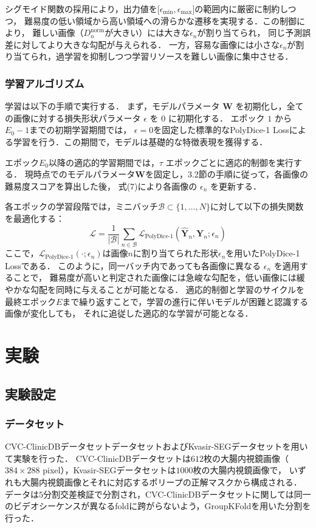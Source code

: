 \documentclass[a4paper,platex,dvipdfmx,twocolumn]{jsarticle}
\begin{document}
シグモイド関数の採用により，出力値を[$\epsilon_{\text{min}}, \epsilon_{\text{max}}]$の範囲内に厳密に制約しつつ，
難易度の低い領域から高い領域への滑らかな遷移を実現する．この制御により，
難しい画像（$D ^ {\text{norm}}_{n}$が大きい）には大きな$\epsilon_n$が割り当てられ，
同じ予測誤差に対してより大きな勾配が与えられる．
一方，容易な画像には小さな$\epsilon_n$が割り当てられ，過学習を抑制しつつ学習リソースを難しい画像に集中させる．

\subsubsection{学習アルゴリズム}
学習は以下の手順で実行する．
まず，モデルパラメータ $\mathbf{W}$ を初期化し，全ての画像に対する損失形状パラメータ $\epsilon$ を $0$ に初期化する．
エポック $1$ から $E_0 - 1$までの初期学習期間では，
$\epsilon=0$を固定した標準的なPolyDice-1 Lossによる学習を行う．この期間で，モデルは基礎的な特徴表現を獲得する．

エポック$E_0$以降の適応的学習期間では，$\tau$ エポックごとに適応的制御を実行する．
現時点でのモデルパラメータ$\mathbf{W}$を固定し，3.2節の手順に従って，各画像の難易度スコアを算出した後，
式(7)により各画像の $\epsilon_n$ を更新する．

各エポックの学習段階では，ミニバッチ$\mathcal{B} \subset \{1, \dots, N\}$に対して以下の損失関数を最適化する：
\begin{equation}
    \mathcal{L} = \frac{1}{|\mathcal{B}|} \sum_{n \in \mathcal{B}} \mathcal{L}_{\text{PolyDice-1}}(\hat{\mathbf{Y}}_n, \mathbf{Y}_n; \epsilon_n)
\end{equation}
ここで，$\mathcal{L}_{\text{PolyDice-1}}(\cdot; \epsilon_n)$は画像$n$に割り当てられた形状$\epsilon_n$を用いたPolyDice-1 Lossである．
このように，同一バッチ内であっても各画像に異なる $\epsilon_n$ を適用することで，
難易度が高いと判定された画像には急峻な勾配を，低い画像には緩やかな勾配を同時に与えることが可能となる．
適応的制御と学習のサイクルを最終エポック$E$まで繰り返すことで，学習の進行に伴いモデルが困難と認識する画像が変化しても，
それに追従した適応的な学習が可能となる．
\section{実験}
\subsection{実験設定}
\subsubsection{データセット}
CVC-ClinicDBデータセット\cite{BERNAL201599}データセットおよびKvasir-SEGデータセット\cite{jha2020kvasir}を用いて実験を行った．
CVC-ClinicDBデータセットは$612$枚の大腸内視鏡画像（$384 \times 288$ pixel），Kvasir-SEGデータセットは$1000$枚の大腸内視鏡画像で，
いずれも大腸内視鏡画像とそれに対応するポリープの正解マスクから構成される．
データは$5$分割交差検証で分割され，CVC-ClinicDBデータセットに関しては同一のビデオシーケンスが異なるfoldに跨がらないよう，GroupKFoldを用いた分割を行った．
\end{document}
